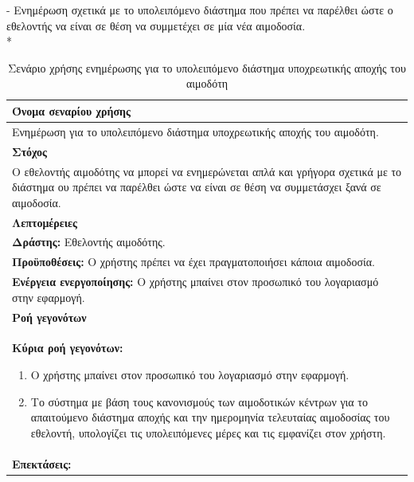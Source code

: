 - Ενημέρωση σχετικά με το υπολειπόμενο διάστημα που πρέπει να παρέλθει ώστε ο εθελοντής να είναι σε θέση να συμμετέχει σε μία νέα αιμοδοσία.
\\*
\begin{table}[H]
	\begin{center}
	    \begin{tabular}{|p{\dimexpr \linewidth-2\tabcolsep}|}
	    \hline
	    \rowcolor{grayy}
	    \textbf{Όνομα σεναρίου χρήσης}
	    \\ \hline    
	     Ενημέρωση για το υπολειπόμενο διάστημα υποχρεωτικής αποχής του αιμοδότη.
	     \\ \hline
	    \rowcolor{grayy}
	    \textbf{\textbf{Στόχος}}
	    \\ \hline
	 	 Ο εθελοντής αιμοδότης να μπορεί να ενημερώνεται απλά και γρήγορα σχετικά με το διάστημα ου πρέπει να παρέλθει ώστε να είναι σε θέση να συμμετάσχει ξανά σε αιμοδοσία.
	    \\ \hline
	    \rowcolor{grayy}
	    \textbf{Λεπτομέρειες}
	    \\ \hline
		\textbf{Δράστης:} Εθελοντής αιμοδότης.
		\\*
		\textbf{Προϋποθέσεις:} Ο χρήστης πρέπει να έχει πραγματοποιήσει κάποια αιμοδοσία.
		\\*
		\textbf{Ενέργεια ενεργοποίησης:} Ο χρήστης μπαίνει στον προσωπικό του λογαριασμό στην εφαρμογή.
		\\ \hline
		\rowcolor{grayy}    
	    \textbf{Ροή γεγονότων}
	    \\ \hline
		\textbf{Κύρια ροή γεγονότων:}
		\begin{enumerate}
			\item	 Ο χρήστης μπαίνει στον προσωπικό του λογαριασμό στην εφαρμογή.
			\item  Το σύστημα με βάση τους κανονισμούς των αιμοδοτικών κέντρων για το απαιτούμενο διάστημα αποχής και την ημερομηνία τελευταίας αιμοδοσίας του εθελοντή, υπολογίζει τις υπολειπόμενες μέρες και τις εμφανίζει στον χρήστη.
		\end{enumerate}
		\\ \hline
		\textbf{Επεκτάσεις:}
		   \\ \hline
	    \end{tabular}
	    \caption{Σενάριο χρήσης ενημέρωσης για το υπολειπόμενο διάστημα υποχρεωτικής αποχής του αιμοδότη}
	    \label{tab:show_days_for_eligibility_to_donate} 
	\end{center}
\end{table}

